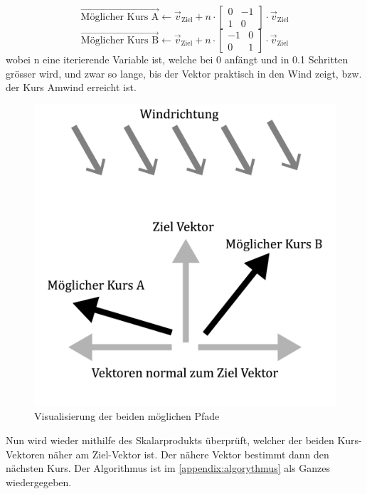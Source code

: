 $$\vec{\text{Möglicher Kurs A}} \gets \vec{v}_{\text{Ziel}} + n \cdot \begin{bmatrix}0 & -1 \\ 1 & 0\end{bmatrix} \cdot \vec{v}_{\text{Ziel}}$$
$$\vec{\text{Möglicher Kurs B}} \gets \vec{v}_{\text{Ziel}} + n \cdot \begin{bmatrix}-1 & 0 \\ 0 & 1\end{bmatrix} \cdot \vec{v}_{\text{Ziel}}$$
wobei n eine iterierende Variable ist, welche bei 0 anfängt und in 0.1 Schritten grösser wird, und zwar so lange, bis der Vektor praktisch in den Wind zeigt, bzw. der Kurs Amwind erreicht ist. \\
\begin{figure}[H]
    \centering
    \includegraphics[width=0.5\linewidth]{algorythmus Vektoren.png}
    \caption{Visualisierung der beiden möglichen Pfade}
    \label{fig:enter-label}
\end{figure}
Nun wird wieder mithilfe des Skalarprodukts überprüft, welcher der beiden Kurs-Vektoren näher am Ziel-Vektor ist. Der nähere Vektor bestimmt dann den nächsten Kurs. Der Algorithmus ist im \cref{appendix:algorythmus} als Ganzes wiedergegeben.
